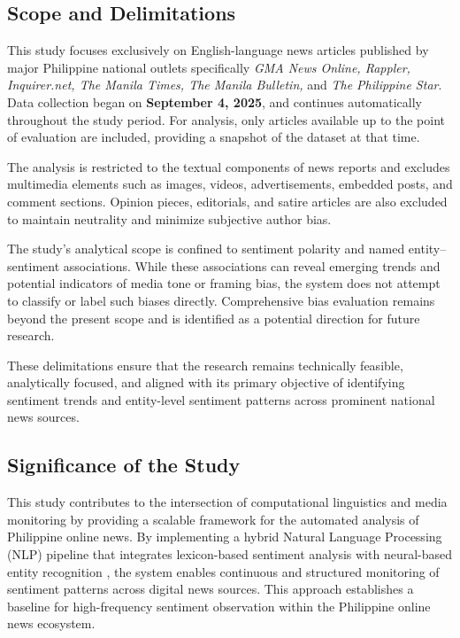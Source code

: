 \subsection{Scope and Delimitations}
This study focuses exclusively on English-language news articles published by major Philippine national outlets specifically \emph{GMA News Online, Rappler, Inquirer.net, The Manila Times, The Manila Bulletin,} and \emph{The Philippine Star}. Data collection began on \textbf{September 4, 2025}, and continues automatically throughout the study period. For analysis, only articles available up to the point of evaluation are included, providing a snapshot of the dataset at that time.

The analysis is restricted to the textual components of news reports and excludes multimedia elements such as images, videos, advertisements, embedded posts, and comment sections. Opinion pieces, editorials, and satire articles are also excluded to maintain neutrality and minimize subjective author bias.

The study's analytical scope is confined to sentiment polarity and named entity-- sentiment associations. While these associations can reveal emerging trends and potential indicators of media tone or framing bias, the system does not attempt to classify or label such biases directly. Comprehensive bias evaluation remains beyond the present scope and is identified as a potential direction for future research.

These delimitations ensure that the research remains technically feasible, analytically focused, and aligned with its primary objective of identifying sentiment trends and entity-level sentiment patterns across prominent national news sources.

\subsection{Significance of the Study}
\label{significance-of-the-study}

This study contributes to the intersection of computational linguistics and media monitoring by providing a scalable framework for the automated analysis of Philippine online news. By implementing a hybrid Natural Language Processing (NLP) pipeline that integrates lexicon-based sentiment analysis \cite{ref08} with neural-based entity recognition \cite{ref26}, the system enables continuous and structured monitoring of sentiment patterns across digital news sources. This approach establishes a baseline for high-frequency sentiment observation within the Philippine online news ecosystem.

